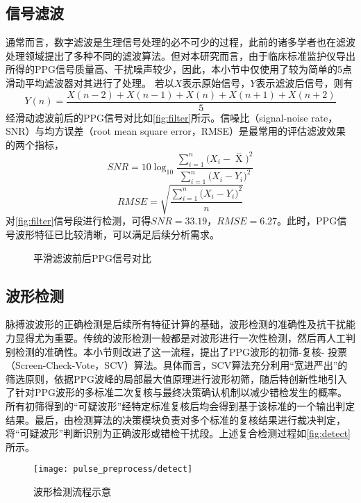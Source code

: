 \subsection{信号滤波}
通常而言，数字滤波是生理信号处理的必不可少的过程，此前的诸多学者也在滤波处理领域提出了多种不同的滤波算法。但对本研究而言，由于临床标准监护仪导出所得的PPG信号质量高、干扰噪声较少，因此，本小节中仅使用了较为简单的5点滑动平均滤波器对其进行了处理。
若以$X$表示原始信号，$Y$表示滤波后信号，则有
\begin{equation}
    \label{equ:filter}
    Y(n)=\frac{X(n-2)+X(n-1)+X(n)+X(n+1)+X(n+2)}{5}
\end{equation}
经滑动滤波前后的PPG信号对比如\autoref{fig:filter}所示。信噪比（signal-noise rate，SNR）与均方误差（root mean square error，RMSE）是最常用的评估滤波效果的两个指标，
\begin{equation}
    \label{equ:snr}
    SNR=10\log_{10}\frac{\sum_{i=1}^{n}{(X_i-\mathop{X} \limits^-})^2}{\sum_{i=1}^{n}{(X_i-Y_i})^2}
\end{equation}
\begin{equation}
    \label{equ:rmse}
    RMSE=\sqrt{\frac{\sum_{i=1}^{n}{(X_i-Y_i})^2}{n}}
\end{equation}
对\autoref{fig:filter}信号段进行检测，可得$SNR=33.19$，$RMSE=6.27$。此时，PPG信号波形特征已比较清晰，可以满足后续分析需求。
\begin{figure}[htbp]
    \centering
    \quad
    \caption{\label{fig:filter}平滑滤波前后PPG信号对比}
\end{figure}

\subsection{波形检测}
脉搏波波形的正确检测是后续所有特征计算的基础，波形检测的准确性及抗干扰能力显得尤为重要。传统的波形检测一般都是对波形进行一次性检测，然后再人工判别检测的准确性。本小节则改进了这一流程，提出了PPG波形的初筛-复核-
投票（Screen-Check-Vote，SCV）算法。具体而言，SCV算法充分利用“宽进严出”的筛选原则，依据PPG波峰的局部最大值原理进行波形初筛，随后特创新性地引入了针对PPG波形的多标准二次复核与最终决策确认机制以减少错检发生的概率。
所有初筛得到的“可疑波形”经特定标准复核后均会得到基于该标准的一个输出判定结果。最后，由检测算法的决策模块负责对多个标准的复核结果进行裁决判定，将“可疑波形”判断识别为正确波形或错检干扰段。上述复合检测过程如\autoref{fig:detect}所示。
\begin{figure}[htbp]
    \centering
    \texttt{[image: pulse\_preprocess/detect]}
    \caption{\label{fig:detect}波形检测流程示意}
\end{figure}

